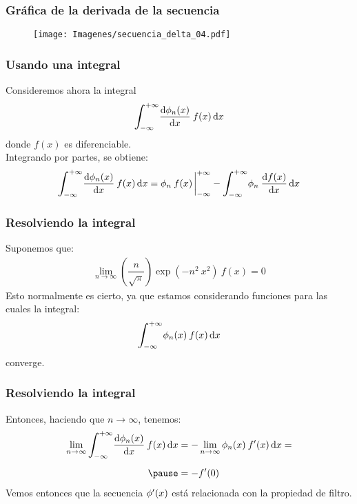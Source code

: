 \documentclass[12pt]{beamer}
\begin{document}
\begin{frame}
\frametitle{Gráfica de la derivada de la secuencia}
\begin{figure}[H]
    \centering
    \texttt{[image: Imagenes/secuencia\_delta\_04.pdf]}
    \label{fig:fig_figura_delta_04}
\end{figure}
\end{frame}

\begin{frame}
\frametitle{Usando una integral}
Consideremos ahora la integral
\begin{align*}
\scaleint{6ex}_{\bs -\infty}^{+\infty} \dv{\phi_{n}(x)}{x} \: f (x) \dd{x}
\end{align*}
donde $f (x)$ es diferenciable.
\\
\bigskip
\pause
Integrando por partes, se obtiene:
\pause
\begin{align*}
\scaleint{6ex}_{\bs -\infty}^{+\infty} \dv{\phi_{n}(x)}{x} \: f (x) \dd{x} = \phi_{n} \: f (x) \eval_{-\infty}^{+\infty} - \scaleint{6ex}_{\bs -\infty}^{+\infty} \phi_{n} \: \dv{f (x)}{x} \dd{x}
\end{align*}
\end{frame}

\begin{frame}
\frametitle{Resolviendo la integral}
Suponemos que:
\pause
\begin{align*}
\lim_{n \to \infty} \left( \dfrac{n}{\sqrt{\pi}} \right) \exp(-n^{2} \: x^{2}) \: f (x) = 0
\end{align*}
\pause
Esto normalmente es cierto, ya que estamos considerando funciones para las cuales la integral:
\pause
\begin{align*}
\scaleint{6ex}_{\bs -\infty}^{+\infty} \phi_{n}(x) \: f (x) \dd{x} 
\end{align*}
converge.
\end{frame}

\begin{frame}
\frametitle{Resolviendo la integral}
Entonces, haciendo que $n \to \infty$, tenemos:
\pause
\begin{eqnarray*}
\begin{aligned}
\lim_{n \to \infty} \scaleint{6ex}_{\bs -\infty}^{+\infty} \dv{\phi_{n}(x)}{x} \: f (x) \dd{x} &= - \lim_{n \to \infty} \phi_{n}(x) \: \pderivada{f} (x) \dd{x} =  \\[0.5em] \pause
&= - \pderivada{f} (0)
\end{aligned}
\end{eqnarray*}
\pause
Vemos entonces que la secuencia ${\phi}^{\prime} (x)$ está relacionada con la propiedad de filtro.
\end{frame}
\end{document}
